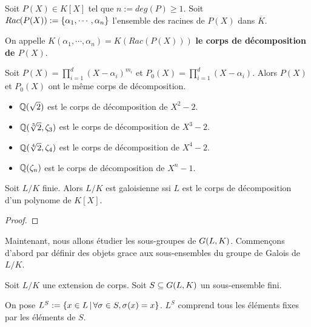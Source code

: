 \begin{definition}
	Soit $P(X) \in K[X]$ tel que $n := deg(P) \geq 1$. Soit $Rac(P(X)) :=
	\left\{ \alpha_{1}, \cdots, \alpha_{n} \right\}$ l'ensemble
	des racines de $P(X)$ dans $\overline{K}$.

	On appelle $K(\alpha_{1}, \cdots, \alpha_{n}) = K(Rac(P(X)))$ \textbf{le
	corps de décomposition de $P(X)$}.
\end{definition}

\begin{remarque}
	Soit $P(X) = \displaystyle \prod_{i = 1}^{d} (X - \alpha_{i})^{m_{i}}$ et
	$P_{0}(X) = \displaystyle \prod_{i = 1}^{d} (X - \alpha_{i})$. Alors $P(X)$
	et $P_{0}(X)$ ont le même corps de décomposition.
\end{remarque}

\begin{exemple}
	\begin{itemize}
		\item $\mathbb{Q}(\sqrt{2})$ est le corps de décomposition de $X^{2} -
			2$.
		\item $\mathbb{Q}(\sqrt[3]{2}, \zeta_{3})$ est le corps de décomposition
			de $X^{3} - 2$.
		\item $\mathbb{Q}(\sqrt[4]{2}, \zeta_{4})$ est le corps de décomposition
			de $X^{4} - 2$.
		\item $\mathbb{Q}(\zeta_{n})$ est le corps de décomposition de $X^{n} -
			1$.
	\end{itemize}
\end{exemple}

\begin{proposition}
	Soit $L/K$ finie. Alors $L/K$ est galoisienne ssi $L$ est le corps de
	décomposition d'un polynome de $K[X]$.
\end{proposition}

\ifdefined\outputproof
\begin{proof}

\end{proof}
\fi

Maintenant, nous allons étudier les sous-groupes de $G(L, K)$.
Commençons d'abord par définir des objets grace aux sous-ensembles du groupe de
Galois de $L/K$.

\begin{definition}
	Soit $L/K$ une extension de corps.
	Soit $S \subseteq G(L, K)$ un sous-ensemble fini.

	On pose $L^{S} := \left\{x \in L \, | \, \forall \sigma \in S, \sigma(x) = x \right\}$.
	$L^{S}$ comprend tous les éléments fixes par les éléments de $S$.
\end{definition}

